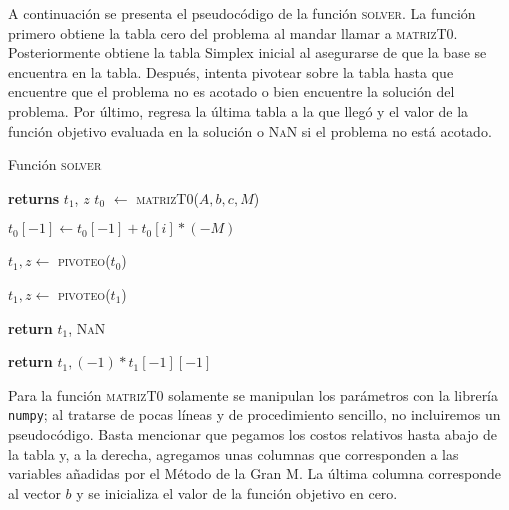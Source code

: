 \documentclass[12pt]{article}
\begin{document}
A continuación se presenta el pseudocódigo de la función \textsc{solver}. La función primero obtiene la tabla cero del problema al mandar llamar a \textsc{matrizT0}. Posteriormente obtiene la tabla Simplex inicial al asegurarse de que la base se encuentra en la tabla. Después, intenta pivotear sobre la tabla hasta que encuentre que el problema no es acotado o bien encuentre la solución del problema. Por último, regresa la última tabla a la que llegó y el valor de la función objetivo evaluada en la solución o \textsc{NaN} si el problema no está acotado.
\begin{center}
    \begin{algorithm}[H]
    \caption{Función \textsc{solver}}
    \begin{algorithmic}
     \textbf{returns} $t_1$, $z$    
    \State $t_0$ $\gets$ \textsc{matrizT0}($A, b, c, M$)

        \State $t_0[-1] \gets t_0[-1] + t_0[i]*(-M)$
    \EndFor        

    \State $t_1, z \gets$ \textsc{pivoteo}($t_0$)

        \State $t_1, z \gets$ \textsc{pivoteo}($t_1$)
    \EndWhile

        \State \textbf{return} $t_1$, \textsc{NaN}
    \EndIf

    \State \textbf{return} $t_1, (-1)*t_1[-1][-1]$

    \EndFunction
    \end{algorithmic}
\end{algorithm}

\end{center}

Para la función \textsc{matrizT0} solamente se manipulan los parámetros con la librería \texttt{numpy}; al tratarse de pocas líneas y de procedimiento sencillo, no incluiremos un pseudocódigo. Basta mencionar que pegamos los costos relativos hasta abajo de la tabla y, a la derecha, agregamos unas columnas que corresponden a las variables añadidas por el Método de la Gran M. La última columna corresponde al vector $b$ y se inicializa el valor de la función objetivo en cero. 
\end{document}

